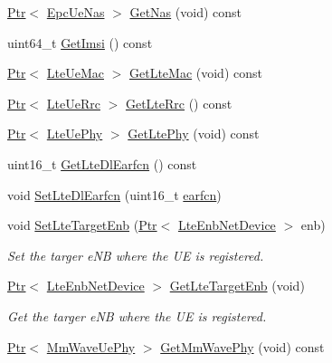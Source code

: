 \begin{DoxyCompactItemize}
\hyperlink{classns3_1_1Ptr}{Ptr}$<$ \hyperlink{classns3_1_1EpcUeNas}{Epc\+Ue\+Nas} $>$ \hyperlink{classns3_1_1McUeNetDevice_a4024d089c4cdfd5fc4af1c1d7ee8a08c}{Get\+Nas} (void) const 
\item 
uint64\+\_\+t \hyperlink{classns3_1_1McUeNetDevice_ac3a9348137e54e3a9650e8de05e987c4}{Get\+Imsi} () const 
\item 
\hyperlink{classns3_1_1Ptr}{Ptr}$<$ \hyperlink{classns3_1_1LteUeMac}{Lte\+Ue\+Mac} $>$ \hyperlink{classns3_1_1McUeNetDevice_ab2b62d02dbfe9958ce7832f54c7f7628}{Get\+Lte\+Mac} (void) const 
\item 
\hyperlink{classns3_1_1Ptr}{Ptr}$<$ \hyperlink{classns3_1_1LteUeRrc}{Lte\+Ue\+Rrc} $>$ \hyperlink{classns3_1_1McUeNetDevice_afb389a4a1a122c9189a8dc13e620d8b5}{Get\+Lte\+Rrc} () const 
\item 
\hyperlink{classns3_1_1Ptr}{Ptr}$<$ \hyperlink{classns3_1_1LteUePhy}{Lte\+Ue\+Phy} $>$ \hyperlink{classns3_1_1McUeNetDevice_ace413d79dc0c681187d552541cc2f83e}{Get\+Lte\+Phy} (void) const 
\item 
uint16\+\_\+t \hyperlink{classns3_1_1McUeNetDevice_a63379201974f0f34edfeef0a8160e61f}{Get\+Lte\+Dl\+Earfcn} () const 
\item 
void \hyperlink{classns3_1_1McUeNetDevice_a4a1b309a4e088661363d9225a7b10eac}{Set\+Lte\+Dl\+Earfcn} (uint16\+\_\+t \hyperlink{generate__test__data__lte__spectrum__value__txpsd_8m_a584be7562abb392609629331f8c6c42c}{earfcn})
\item 
void \hyperlink{classns3_1_1McUeNetDevice_a8a38b5292b87892d886e2c85749ca372}{Set\+Lte\+Target\+Enb} (\hyperlink{classns3_1_1Ptr}{Ptr}$<$ \hyperlink{classns3_1_1LteEnbNetDevice}{Lte\+Enb\+Net\+Device} $>$ enb)
\begin{DoxyCompactList}\small\item\em Set the targer e\+NB where the UE is registered. \end{DoxyCompactList}\item 
\hyperlink{classns3_1_1Ptr}{Ptr}$<$ \hyperlink{classns3_1_1LteEnbNetDevice}{Lte\+Enb\+Net\+Device} $>$ \hyperlink{classns3_1_1McUeNetDevice_a71676cb0d0a2f3bbc1585515e6b5e388}{Get\+Lte\+Target\+Enb} (void)
\begin{DoxyCompactList}\small\item\em Get the targer e\+NB where the UE is registered. \end{DoxyCompactList}\item 
\hyperlink{classns3_1_1Ptr}{Ptr}$<$ \hyperlink{classns3_1_1MmWaveUePhy}{Mm\+Wave\+Ue\+Phy} $>$ \hyperlink{classns3_1_1McUeNetDevice_ab3eca57caf2cb5d2797c5b7b2f10923d}{Get\+Mm\+Wave\+Phy} (void) const 

\end{DoxyCompactItemize}
